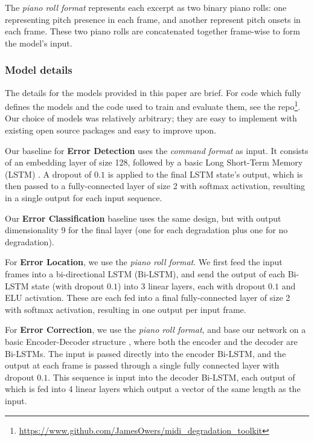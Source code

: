 \documentclass{article}
\def \mdtkurl {https://www.github.com/JamesOwers/midi_degradation_toolkit}
\begin{document}
The \textit{piano roll format} represents each excerpt as two binary piano rolls: one representing pitch presence in each frame, and another represent pitch onsets in each frame. These two piano rolls are concatenated together frame-wise to form the model's input.


\subsubsection{Model details}
The details for the models provided in this paper are brief. For code which fully defines the models and the code used to train and evaluate them, see the repo\footnote{\url{\mdtkurl}}. Our choice of models was relatively arbitrary; they are easy to implement with existing open source packages and easy to improve upon.

Our baseline for \textbf{Error Detection} uses the \textit{command format} as input. It consists of an embedding layer of size 128, followed by a basic Long Short-Term Memory (LSTM) \cite{hochreiter1997long}. A dropout of $0.1$ is applied to the final LSTM state's output, which is then passed to a fully-connected layer of size 2 with softmax activation, resulting in a single output for each input sequence.

Our \textbf{Error Classification} baseline uses the same design, but with output dimensionality 9 for the final layer (one for each degradation plus one for no degradation).

For \textbf{Error Location}, we use the \textit{piano roll format}. We first feed the input frames into a bi-directional LSTM (Bi-LSTM), and send the output of each Bi-LSTM state (with dropout $0.1$) into 3 linear layers, each with dropout $0.1$ and ELU activation. These are each fed into a final fully-connected layer of size 2 with softmax activation, resulting in one output per input frame.

For \textbf{Error Correction}, we use the \textit{piano roll format}, and base our network on a basic Encoder-Decoder structure \cite{cho2014learning}, where both the encoder and the decoder are Bi-LSTMs. The input is passed directly into the encoder Bi-LSTM, and the output at each frame is passed through a single fully connected layer with dropout $0.1$. This sequence is input into the decoder Bi-LSTM, each output of which is fed into 4 linear layers which output a vector of the same length as the input.
\end{document}
